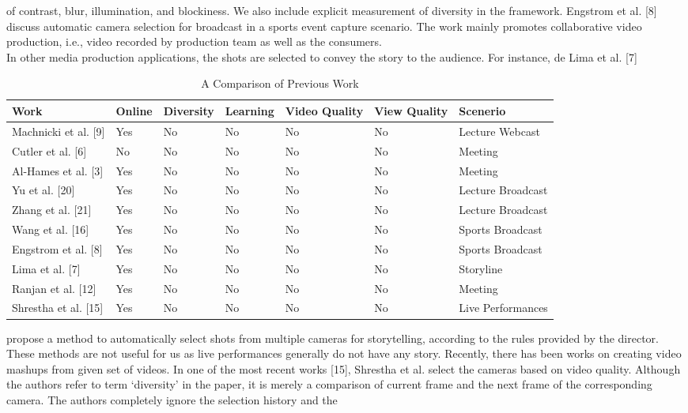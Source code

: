 \documentclass{sig-alternate}
\begin{document}
{{{of contrast, blur, illumination, and blockiness. We also include
explicit measurement of diversity in the framework. Engstrom et
al. [8] discuss automatic camera selection for broadcast in a sports
event capture scenario. The work mainly promotes collaborative
video production, i.e., video recorded by production team as well
as the consumers.\\
In other media production applications, the shots are selected to
convey the story to the audience. For instance, de Lima et al. [7]
\begin{table}
\centering
\caption{A Comparison of Previous Work}
\begin{tabular}{l|l|l|l|l|l|l} \hline
Work&Online&Diversity&Learning&Video Quality&View Quality&Scenerio\\ \hline
Machnicki et al. [9] & Yes& No & No & No & No & Lecture Webcast\\ \hline
Cutler et al. [6] & No& No & No & No & No & Meeting \\ \hline
Al-Hames et al. [3]& Yes& No & No & No & No &Meeting \\ \hline
Yu et al. [20]& Yes& No & No & No & No & Lecture Broadcast\\ \hline
Zhang et al. [21]& Yes& No & No & No & No & Lecture Broadcast\\ \hline
Wang et al. [16]& Yes& No & No & No & No & Sports Broadcast\\ \hline
Engstrom et al. [8]& Yes& No & No & No & No & Sports Broadcast\\ \hline
Lima et al. [7]& Yes& No & No & No & No & Storyline\\ \hline
Ranjan et al. [12]& Yes& No & No & No & No & Meeting \\ \hline
Shrestha et al. [15]& Yes& No & No & No & No & Live Performances\\ \hline
\end{tabular}
\end{table}
propose a method to automatically select shots from multiple cameras
for storytelling, according to the rules provided by the director.
These methods are not useful for us as live performances generally
do not have any story.
Recently, there has been works on creating video mashups from
given set of videos. In one of the most recent works [15], Shrestha
et al. select the cameras based on video quality. Although the authors
refer to term ‘diversity’ in the paper, it is merely a comparison
of current frame and the next frame of the corresponding camera.
The authors completely ignore the selection history and the
}}}
\end{document}
